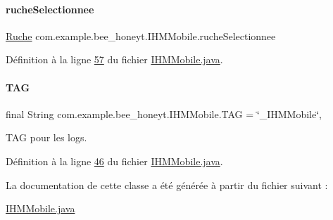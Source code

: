 \paragraph{\texorpdfstring{ruche\+Selectionnee}{rucheSelectionnee}}
{\footnotesize\ttfamily \hyperlink{classcom_1_1example_1_1bee__honeyt_1_1_ruche}{Ruche} com.\+example.\+bee\+\_\+honeyt.\+I\+H\+M\+Mobile.\+ruche\+Selectionnee\hspace{0.3cm}{\ttfamily [private]}}



Définition à la ligne \hyperlink{_i_h_m_mobile_8java_source_l00057}{57} du fichier \hyperlink{_i_h_m_mobile_8java_source}{I\+H\+M\+Mobile.\+java}.

\mbox{\label{classcom_1_1example_1_1bee__honeyt_1_1_i_h_m_mobile_a366987bf9bb2ed1010b2f967d4efa263}} 
\paragraph{\texorpdfstring{T\+AG}{TAG}}
{\footnotesize\ttfamily final String com.\+example.\+bee\+\_\+honeyt.\+I\+H\+M\+Mobile.\+T\+AG = \char`\"{}\+\_\+\+I\+H\+M\+Mobile\char`\"{}\hspace{0.3cm}{\ttfamily [static]}, {\ttfamily [private]}}



T\+AG pour les logs. 



Définition à la ligne \hyperlink{_i_h_m_mobile_8java_source_l00046}{46} du fichier \hyperlink{_i_h_m_mobile_8java_source}{I\+H\+M\+Mobile.\+java}.



La documentation de cette classe a été générée à partir du fichier suivant \+:\begin{DoxyCompactItemize}
\item 
\hyperlink{_i_h_m_mobile_8java}{I\+H\+M\+Mobile.\+java}\end{DoxyCompactItemize}
